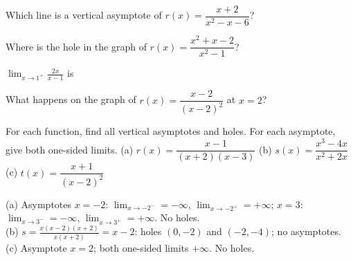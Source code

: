 \begin{exo}{}
Which line is a vertical asymptote of $r(x)=\dfrac{x+2}{x^2-x-6}$?
\end{exo}
\begin{exo}{}
Where is the hole in the graph of $r(x)=\dfrac{x^2+x-2}{x^2-1}$?
\end{exo}
\begin{exo}{}
$\displaystyle\lim_{x\to1^+}\frac{2x}{x-1}$ is
\end{exo}
\begin{exo}{}
What happens on the graph of $r(x)=\dfrac{x-2}{(x-2)^2}$ at $x=2$?
\end{exo}
\begin{exo}{}
For each function, find all vertical asymptotes and holes. For each asymptote, give both one-sided limits.
(a) $r(x)=\dfrac{x-1}{(x+2)(x-3)}$ \qquad (b) $s(x)=\dfrac{x^3-4x}{x^2+2x}$ \qquad (c) $t(x)=\dfrac{x+1}{(x-2)^2}$
\begin{solution}
(a) Asymptotes $x=-2$: $\lim_{x\to-2^-}=-\infty$, $\lim_{x\to-2^+}=+\infty$; $x=3$: $\lim_{x\to3^-}=-\infty$, $\lim_{x\to3^+}=+\infty$. No holes.\\
(b) $s=\frac{x(x-2)(x+2)}{x(x+2)}=x-2$: holes $(0,-2)$ and $(-2,-4)$; no asymptotes.\\
(c) Asymptote $x=2$; both one-sided limits $+\infty$. No holes.
\end{solution}
\end{exo}

